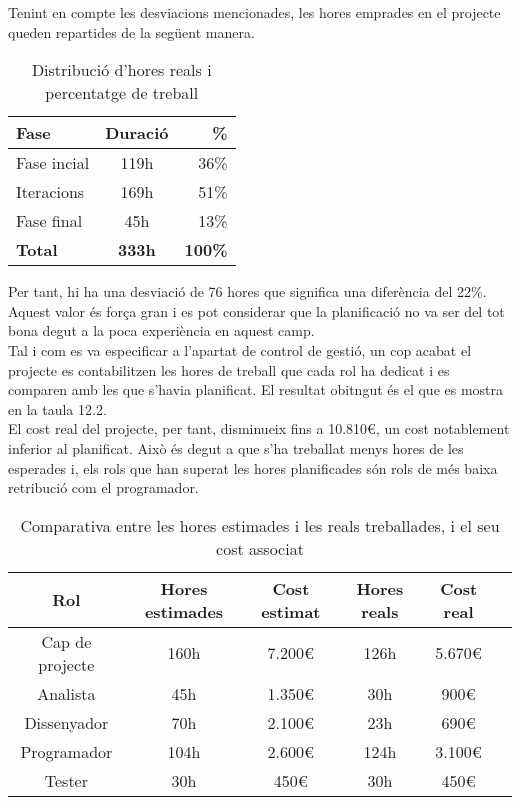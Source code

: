 Tenint en compte les desviacions mencionades, les hores emprades en el projecte queden repartides de la següent manera.

\begin{table}[!h]
\centering
\begin{tabular}{|l|c|r|}
\hline
\textbf{Fase}  & \textbf{Duració} & \textbf{\%} \\\hline
Fase incial & 119h & 36\% \\\hline
Iteracions & 169h & 51\% \\\hline
Fase final & 45h & 13\% \\\hline
\textbf{Total} & \textbf{333h}  & \textbf{100\%} \\\hline
\end{tabular}
\label{}
\caption{Distribució d'hores reals i percentatge de treball}
\end{table}

Per tant, hi ha una desviació de 76 hores que significa una diferència del 22\%. Aquest valor és força gran i es pot considerar que la planificació no va ser del
tot bona degut a la poca experiència en aquest camp.\\

Tal i com es va especificar a l’apartat de control de gestió, un cop acabat el projecte es contabilitzen les hores de treball que cada rol ha dedicat i es comparen amb les que s’havia planificat. El resultat obitngut és el que es mostra en la
taula 12.2.\\

El cost real del projecte, per tant, disminueix fins a 10.810\euro, un cost notablement inferior al planificat. Això és degut a que s’ha treballat menys hores de
les esperades i, els rols que han superat les hores planificades són rols de més
baixa retribució com el programador.

\begin{table}[!h]
\centering
\begin{tabular}{|c|c|c|c|c|c|}
\hline
\textbf{Rol}  & \textbf{Hores estimades} & \textbf{Cost estimat} & \textbf{Hores reals} & \textbf{Cost real}   \\ \hline
Cap de projecte & 160h & 7.200\euro & 126h & 5.670\euro \\\hline
Analista & 45h & 1.350\euro & 30h & 900\euro \\\hline
Dissenyador & 70h & 2.100\euro & 23h & 690\euro \\\hline
Programador & 104h & 2.600\euro & 124h & 3.100\euro \\\hline
Tester & 30h & 450\euro & 30h & 450\euro \\\hline
\end{tabular} 
\label{}
\caption{Comparativa entre les hores estimades i les reals treballades, i el seu cost associat}
\end{table}

